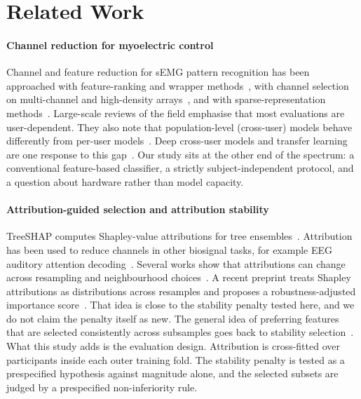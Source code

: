 \section{Related Work}
\label{sec:related_work}

\paragraph{Channel reduction for myoelectric control}
Channel and feature reduction for sEMG pattern recognition has been approached with feature-ranking and wrapper methods~\cite{phinyomark2012feature,liu2014emg}, with channel selection on multi-channel and high-density arrays~\cite{altimemy2013classification,stango2015spatial}, and with sparse-representation methods~\cite{qu2021reduce}. Large-scale reviews of the field emphasise that most evaluations are user-dependent. They also note that population-level (cross-user) models behave differently from per-user models~\cite{phinyomark2018emg}. Deep cross-user models and transfer learning are one response to this gap~\cite{cote2019deep}. Our study sits at the other end of the spectrum: a conventional feature-based classifier, a strictly subject-independent protocol, and a question about hardware rather than model capacity.

\paragraph{Attribution-guided selection and attribution stability}
TreeSHAP computes Shapley-value attributions for tree ensembles~\cite{lundberg2017unified,lundberg2020local}. Attribution has been used to reduce channels in other biosignal tasks, for example EEG auditory attention decoding~\cite{salmi2025shapaad}. Several works show that attributions can change across resampling and neighbourhood choices~\cite{visani2022statistical,kelodjou2023shaping}. A recent preprint treats Shapley attributions as distributions across resamples and proposes a robustness-adjusted importance score~\cite{xiang2026roshap}. That idea is close to the stability penalty tested here, and we do not claim the penalty itself as new. The general idea of preferring features that are selected consistently across subsamples goes back to stability selection~\cite{meinshausen2010stability}. What this study adds is the evaluation design. Attribution is cross-fitted over participants inside each outer training fold. The stability penalty is tested as a prespecified hypothesis against magnitude alone, and the selected subsets are judged by a prespecified non-inferiority rule.

